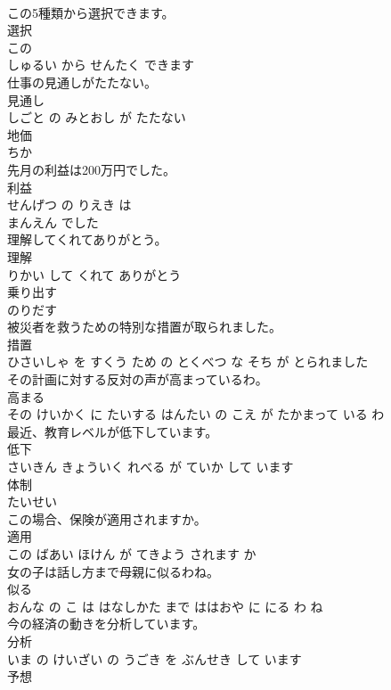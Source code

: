 \documentclass[8pt]{extreport}
\begin{document}
\begin{CJK}{UTF8}{min}
\\	この5種類から選択できます。	
\\	選択 
\\	この 
\\	しゅるい から せんたく できます			
\\	仕事の見通しがたたない。	
\\	見通し 
\\	しごと の みとおし が たたない			
\\	地価	
\\	ちか			
\\	先月の利益は200万円でした。	
\\	利益 
\\	せんげつ の りえき は 
\\	まんえん でした			
\\	理解してくれてありがとう。	
\\	理解 
\\	りかい して くれて ありがとう			
\\	乗り出す	
\\	のりだす			
\\	被災者を救うための特別な措置が取られました。	
\\	措置 
\\	ひさいしゃ を すくう ため の とくべつ な そち が とられました			
\\	その計画に対する反対の声が高まっているわ。	
\\	高まる 
\\	その けいかく に たいする はんたい の こえ が たかまって いる わ			
\\	最近、教育レベルが低下しています。	
\\	低下 
\\	さいきん きょういく れべる が ていか して います			
\\	体制	
\\	たいせい			
\\	この場合、保険が適用されますか。	
\\	適用 
\\	この ばあい ほけん が てきよう されます か			
\\	女の子は話し方まで母親に似るわね。	
\\	似る 
\\	おんな の こ は はなしかた まで ははおや に にる わ ね			
\\	今の経済の動きを分析しています。	
\\	分析 
\\	いま の けいざい の うごき を ぶんせき して います			
\\	予想	

\end{CJK}
\end{document}
